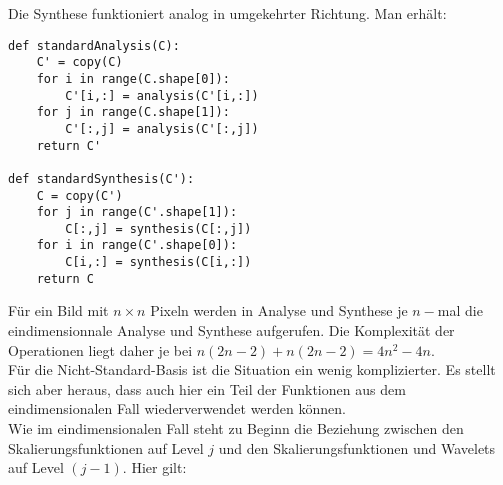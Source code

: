 %
Die Synthese funktioniert analog in umgekehrter Richtung. Man erhält:
%
\begin{verbatim}
def standardAnalysis(C):
    C' = copy(C)
    for i in range(C.shape[0]):
        C'[i,:] = analysis(C'[i,:])
    for j in range(C.shape[1]):
        C'[:,j] = analysis(C'[:,j])
    return C'

def standardSynthesis(C'):
    C = copy(C')
    for j in range(C'.shape[1]):
        C[:,j] = synthesis(C[:,j])
    for i in range(C'.shape[0]):
        C[i,:] = synthesis(C[i,:])
    return C
\end{verbatim}
%
Für ein Bild mit $n \times n$ Pixeln werden in Analyse und Synthese je $n-$mal die eindimensionnale Analyse und Synthese aufgerufen. Die Komplexität der Operationen liegt daher je bei $n(2n-2) + n(2n-2) = 4n^2-4n$.
\\
Für die Nicht-Standard-Basis ist die Situation ein wenig komplizierter. Es stellt sich aber heraus, dass auch hier ein Teil der Funktionen aus dem eindimensionalen Fall wiederverwendet werden können.\\
Wie im eindimensionalen Fall steht zu Beginn die Beziehung zwischen den Skalierungsfunktionen auf Level $j$ und den Skalierungsfunktionen und Wavelets auf Level $(j-1)$. Hier gilt:
%
%
